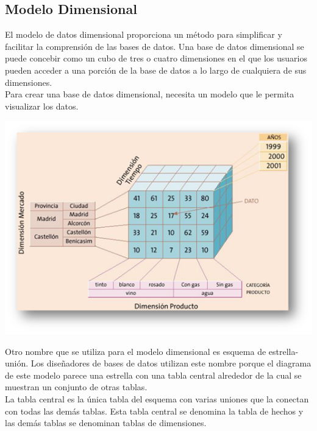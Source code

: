 \documentclass[preprint,12pt]{elsarticle}
\begin{document}
\subsection{Modelo Dimensional}
El modelo de datos dimensional proporciona un método para simplificar y facilitar la comprensión de las bases de datos. Una base de datos dimensional se puede concebir como un cubo de tres o cuatro dimensiones en el que los usuarios pueden acceder a una porción de la base de datos a lo largo de cualquiera de sus dimensiones.\\

Para crear una base de datos dimensional, necesita un modelo que le permita visualizar los datos.\\
\begin{center}
	\includegraphics[width=14cm]{./Imagenes/jho1} 
\end{center}
Otro nombre que se utiliza para el modelo dimensional es esquema de estrella-unión. Los diseñadores de bases de datos utilizan este nombre porque el diagrama de este modelo parece una estrella con una tabla central alrededor de la cual se muestran un conjunto de otras tablas.\\

La tabla central es la única tabla del esquema con varias uniones que la conectan con todas las demás tablas. Esta tabla central se denomina la tabla de hechos y las demás tablas se denominan tablas de dimensiones.\\
\end{document}
